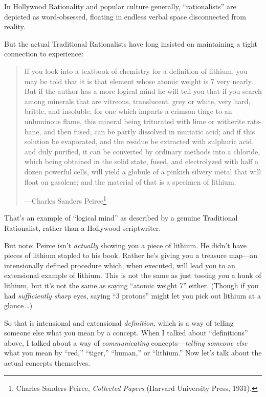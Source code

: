 {{{
 In Hollywood Rationality and popular culture generally,
``rationalists'' are depicted as
word-obsessed, floating in endless verbal space disconnected from
reality.}

{
 But the actual Traditional Rationalists have long insisted on
maintaining a tight connection to experience:}

\begin{quote}
{
 If you look into a textbook of chemistry for a definition of
lithium, you may be told that it is that element whose atomic weight is
7 very nearly. But if the author has a more logical mind he will tell
you that if you search among minerals that are vitreous, translucent,
grey or white, very hard, brittle, and insoluble, for one which imparts
a crimson tinge to an unluminous flame, this mineral being triturated
with lime or witherite rats-bane, and then fused, can be partly
dissolved in muriatic acid; and if this solution be evaporated, and the
residue be extracted with sulphuric acid, and duly purified, it can be
converted by ordinary methods into a chloride, which being obtained in
the solid state, fused, and electrolyzed with half a dozen powerful
cells, will yield a globule of a pinkish silvery metal that will float
on gasolene; and the material of that is a specimen of lithium.}

{\raggedleft
 {}---Charles Sanders Peirce\footnote{Charles Sanders Peirce, \textit{Collected Papers} (Harvard
University Press, 1931).}
\par}
\end{quote}


{
 That's an example of ``logical
mind'' as described by a genuine Traditional
Rationalist, rather than a Hollywood scriptwriter.}

{
 But note: Peirce isn't \textit{actually} showing
you a piece of lithium. He didn't have pieces of
lithium stapled to his book. Rather he's giving you a
treasure map---an intensionally defined procedure which, when executed,
will lead you to an extensional example of lithium. This is not the
same as just tossing you a hunk of lithium, but it's
not the same as saying ``atomic weight
7'' either. (Though if you had \textit{sufficiently
sharp} eyes, saying ``3 protons''
might let you pick out lithium at a glance\,\ldots)}

{
 So that is intensional and extensional \textit{definition}, which
is a way of telling someone else what you mean by a concept. When I
talked about ``definitions'' above,
I talked about a way of \textit{communicating}
concepts---\textit{telling someone else} what you mean by
``red,''
``tiger,''
``human,'' or
``lithium.'' Now
let's talk about the actual concepts themselves.}

}}
